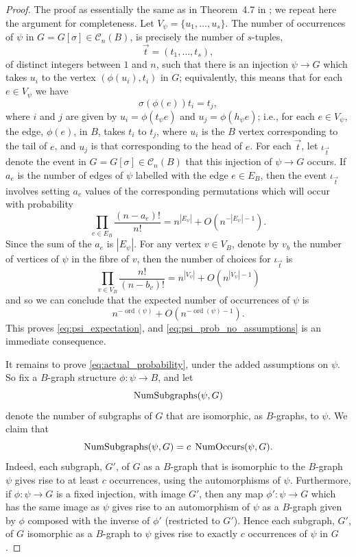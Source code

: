 \documentclass{memo-l}
\theoremstyle{plain}
\theoremstyle{definition}
\numberwithin{section}{chapter}
\numberwithin{equation}{chapter}
\DeclareMathOperator{\ord}{ord}
\DeclareMathOperator{\NumOccurs}{NumOccurs}
\newcommand{\from}{\colon}
\newcommand{\BigOn}[1]{O\left( #1 \right)}
\theoremstyle{plain}
\theoremstyle{definition}
\newcommand\cC{\mathcal{C}}
\begin{document}
\begin{proof}
The proof as essentially the same 
as in Theorem~4.7 in \cite{friedman_alon};  we
repeat here the argument for completeness. 
Let \( V_\psi =
\{ u_1, \ldots, u_s \} \).
The number of occurrences of $\psi$ in $G=G[\sigma]\in\cC_n(B)$, is 
precisely the number of $s$-tuples,
$$
\vec t = (t_1,\ldots,t_s),
$$
of distinct integers
between \(1\) and \(n\), such that there is an injection 
$\psi\to G$ which takes $u_i$ to the vertex $(\phi(u_i),t_i)$ in $G$;
equivalently, this means that for each $e\in V_\psi$ we have
$$
\sigma(\phi(e))t_i = t_j,
$$
where $i$ and $j$ are given by $u_i=\phi(t_\psi e)$ and
$u_j=\phi(h_\psi e)$;
i.e., for each $e\in V_\psi$,
the edge, $\phi(e)$, in $B$, takes $t_i$ to $t_j$,
where $u_i$ is the $B$ vertex corresponding to the tail of $e$,
and $u_j$ is that corresponding to the head of $e$.
For each $\vec t$, let \( \iota_{\vec t} \) denote the event in 
$G=G[\sigma]\in\cC_n(B)$
that this injection of $\psi\to G$ occurs.
If \(a_e\) is the number of edges of \( \psi \)
labelled with the edge \( e \in E_B \), then the event \( \iota_{\vec t} \)
involves setting \( a_e \) values of the corresponding permutations which
will occur with probability \[ \prod_{e \in E_B}
\frac{(n-a_e)!}{n!} = n^{|E_\psi|} + \BigOn{ n^{-|E_\psi|-1} }. \] Since the
sum of the \( a_e \) is \( |E_\psi| \). For any vertex \( v \in V_B \),
denote by \( v_b \) the number of vertices of \( \psi \) in the fibre of \(
v \), then the number of choices for \( \iota_{\vec t} \) is \[ \prod_{v
\in V_B} \frac{n!}{(n-b_v)!} = n^{|V_\psi|} + \BigOn{n^{|V_\psi|-1}} \] and
so we can conclude that the expected number of occurrences of \( \psi \) is
\[ n^{-\ord(\psi)} + \BigOn{n^{-\ord(\psi)-1}}. \] 
This proves \eqref{eq:psi_expectation}, and 
\eqref{eq:psi_prob_no_assumptions} is an immediate consequence.

It remains to prove
\eqref{eq:actual_probability}, under the added assumptions on $\psi$.
So fix a $B$-graph structure $\phi\from\psi\to B$, and let 
$$
{\rm NumSubgraphs}(\psi,G)
$$
denote the number of subgraphs of $G$ that are isomorphic, as $B$-graphs,
to $\psi$.  We claim that 
$$
{\rm NumSubgraphs}(\psi,G) = c \; \NumOccurs(\psi,G).
$$
Indeed, each subgraph, $G'$, of $G$ as a $B$-graph that is isomorphic to
the $B$-graph $\psi$ gives rise to at least $c$
occurrences, using the automorphisms of $\psi$.  Furthermore, if 
$\phi\from\psi \to G$ is a fixed injection, with image $G'$, then any map
$\phi'\from\psi\to G$ which has the same image as $\psi$ gives rise
to an automorphism of $\psi$ as a $B$-graph
given by $\phi$ composed with the
inverse of $\phi'$ (restricted to $G'$).
Hence each subgraph, $G'$, of $G$ isomorphic as a $B$-graph to
$\psi$ gives rise to exactly $c$ occurrences of $\psi$ in $G$.


\end{proof}
\end{document}
